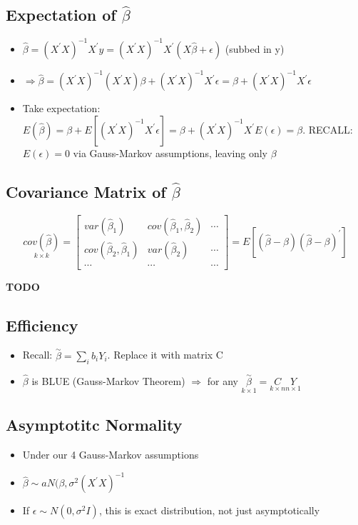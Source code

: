 \documentclass[10pt, oneside]{article}
\begin{document}
\subsection{Expectation of $\hat \beta$}
\begin{itemize}
    \item $\hat \beta = (X^\prime X)^{-1} X^\prime y = (X^\prime X)^{-1} X^\prime (X\hat \beta + \epsilon)$ (subbed in y)
    \item $\Rightarrow \hat \beta = (X^\prime X)^{-1} (X^\prime X)\beta + (X^\prime X)^{-1} X^\prime \epsilon = \beta + (X^\prime X)^{-1} X^\prime \epsilon$
    \item Take expectation: $E(\hat \beta) = \beta + E[(X^\prime X)^{-1} X^\prime \epsilon] = \beta + (X^\prime X)^{-1} X^\prime E(\epsilon) = \beta$. RECALL: $E(\epsilon) = 0$ via Gauss-Markov assumptions, leaving only $\beta$
\end{itemize}

\subsection{Covariance Matrix of $\hat \beta$}
\[\underset{k\times k}{cov(\hat \beta)} = \begin{bmatrix}
    var(\hat \beta_1) & cov(\hat \beta_1, \hat \beta_2 ) &\cdots\\
    cov(\hat \beta_2, \hat \beta_1) & var(\hat \beta_2) & \cdots \\
    \cdots & \cdots & \cdots
\end{bmatrix} = E[(\hat \beta- \beta)(\hat \beta - \beta)^\prime]\]

\textbf{TODO}

\subsection{Efficiency}
\begin{itemize}
    \item Recall: $\overset{\sim }{\beta} = \sum_i b_i Y_i$. Replace it with matrix C
    \item $\hat \beta$ is BLUE (Gauss-Markov Theorem) $\Rightarrow$ for any $\underset{k\times 1}{\overset{\sim}{\beta}} = \underset{k\times n}{C}\underset{n\times 1}{Y}$
\end{itemize}

\subsection{Asymptotitc Normality}
\begin{itemize}
    \item Under our 4 Gauss-Markov assumptions
    \item $\hat \beta \sim a N(\beta , \sigma^2 (X^\prime X)^{-1}$
    \item If $\epsilon \sim N(0, \sigma^2 I)$, this is exact distribution, not just asymptotically
\end{itemize}
\end{document}
